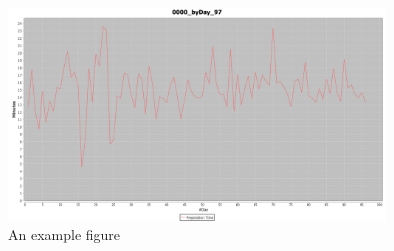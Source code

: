 \begin{figure}[h]
\begin{center}
\includegraphics[width=10cm]{images/0000_byDay_97.png}
\caption{An example figure}
\label{fig:example}
\end{center}
\end{figure}

